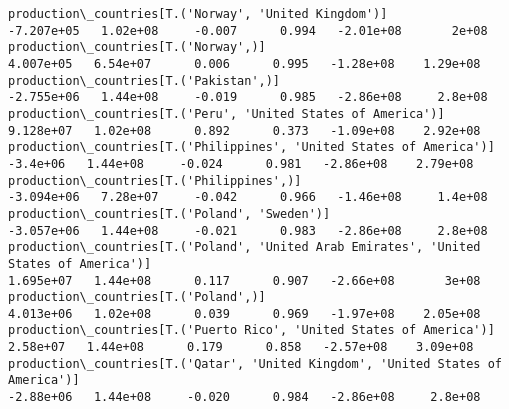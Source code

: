\documentclass[11pt]{article}
\begin{document}
\begin{Verbatim}[commandchars=\\\{\}]
production\_countries[T.('Norway', 'United Kingdom')]                                                                                                                                  -7.207e+05   1.02e+08     -0.007      0.994   -2.01e+08       2e+08
production\_countries[T.('Norway',)]                                                                                                                                                    4.007e+05   6.54e+07      0.006      0.995   -1.28e+08    1.29e+08
production\_countries[T.('Pakistan',)]                                                                                                                                                 -2.755e+06   1.44e+08     -0.019      0.985   -2.86e+08     2.8e+08
production\_countries[T.('Peru', 'United States of America')]                                                                                                                           9.128e+07   1.02e+08      0.892      0.373   -1.09e+08    2.92e+08
production\_countries[T.('Philippines', 'United States of America')]                                                                                                                     -3.4e+06   1.44e+08     -0.024      0.981   -2.86e+08    2.79e+08
production\_countries[T.('Philippines',)]                                                                                                                                              -3.094e+06   7.28e+07     -0.042      0.966   -1.46e+08     1.4e+08
production\_countries[T.('Poland', 'Sweden')]                                                                                                                                          -3.057e+06   1.44e+08     -0.021      0.983   -2.86e+08     2.8e+08
production\_countries[T.('Poland', 'United Arab Emirates', 'United States of America')]                                                                                                 1.695e+07   1.44e+08      0.117      0.907   -2.66e+08       3e+08
production\_countries[T.('Poland',)]                                                                                                                                                    4.013e+06   1.02e+08      0.039      0.969   -1.97e+08    2.05e+08
production\_countries[T.('Puerto Rico', 'United States of America')]                                                                                                                     2.58e+07   1.44e+08      0.179      0.858   -2.57e+08    3.09e+08
production\_countries[T.('Qatar', 'United Kingdom', 'United States of America')]                                                                                                        -2.88e+06   1.44e+08     -0.020      0.984   -2.86e+08     2.8e+08

\end{Verbatim}
\end{document}
